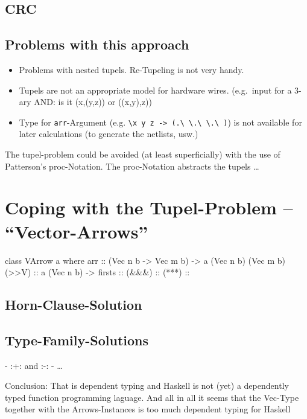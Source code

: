 \documentclass[9pt,final,a4paper,leqno]{article}
\newcommand{\hs}[1]{\mbox{\lstinline[basicstyle=\color{textgray}]!#1!}}
\begin{document}
\subsection{CRC}

\subsection{Problems with this approach}

\begin{itemize}
\item Problems with nested tupels. Re-Tupeling is not very handy.
\item Tupels are not an appropriate model for hardware wires. (e.g.\ input for a 3-ary AND: is it (x,(y,z)) or ((x,y),z)) 
\item Type for \hs{arr}-Argument (e.g. \hs{\x y z -> (.\ \.\ \.\ )}) is not available for later calculations (to generate the netlists, usw.)
\end{itemize}

The tupel-problem could be avoided (at least superficially) with the use of Patterson's proc-Notation. The proc-Notation
abstracts the tupels \ldots 


\section{Coping with the Tupel-Problem -- "`Vector-Arrows"'}

\begin{haskell}
class VArrow a where
  arr    :: (Vec n b -> Vec m b) -> a (Vec n b) (Vec m b)
  (>>V)  :: a (Vec n b) -> 
  firsts :: 
  (&&&)  :: 
  (***)  :: 
\end{haskell}

\subsection{Horn-Clause-Solution}

\subsection{Type-Family-Solutions}

-  :+: and :-:
- \ldots

Conclusion: That is dependent typing and Haskell is not (yet) a dependently typed function programming laguage. And all
in all it seems that the Vec-Type together with the Arrows-Instances is too much dependent typing for Haskell
\end{document}
